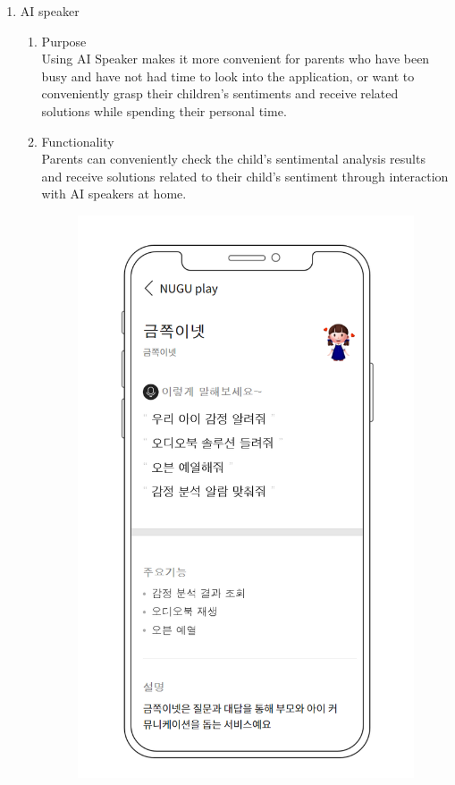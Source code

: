 \documentclass[conference]{IEEEtran}
\begin{document}
\begin{enumerate}
    \item AI speaker
        \begin{enumerate}
            \item Purpose
            \\Using AI Speaker makes it more convenient for parents who have been busy and have not had time to look into the application, or want to conveniently grasp their children's sentiments and receive related solutions while spending their personal time.\newline
            
            \item Functionality
            \\ Parents can conveniently check the child's sentimental analysis results and receive solutions related to their child's sentiment through interaction with AI speakers at home.
            \begin{figure}[H]
            \centering
            \includegraphics[scale=0.3]{new_assets/nugu-play-1.png}
            \end{figure}
            

\end{enumerate}
\end{enumerate}
\end{document}
